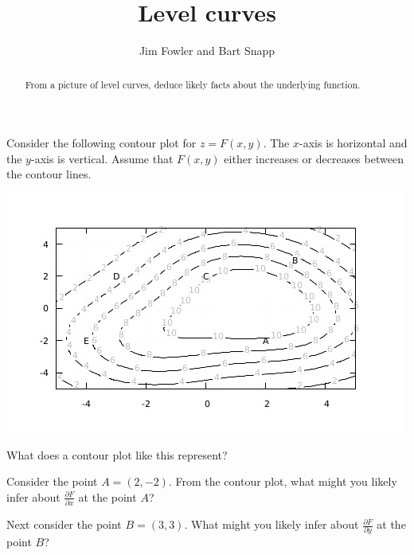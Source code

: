 \documentclass{ximera}
\author{Jim Fowler and Bart Snapp}
\title{Level curves}
\begin{document}
\begin{abstract}
From a picture of level curves, deduce likely facts about the underlying function.
\end{abstract}

Consider the following contour plot for $z = F(x,y)$.  The $x$-axis is horizontal and the $y$-axis is vertical.  Assume that $F(x,y)$ either increases or decreases between the contour lines.
\begin{image}
\includegraphics[width=.9\linewidth]{contourPlot2.jpg}
\end{image}
\begin{exercise}
What does a contour plot like this represent?
\begin{multipleChoice}
\end{multipleChoice}
\end{exercise}


\begin{exercise}
Consider the point $A = (2,-2)$.  From the contour plot, what might you likely infer about $\frac{\partial F}{\partial x}$ at the point $A$?
\begin{multipleChoice}
\end{multipleChoice}
\end{exercise}

\begin{exercise}
Next consider the point $B = (3,3)$.  What might you likely infer about $\frac{\partial F}{\partial y}$ at the point $B$?
\begin{multipleChoice}
\end{multipleChoice}
\end{exercise}
\end{document}
